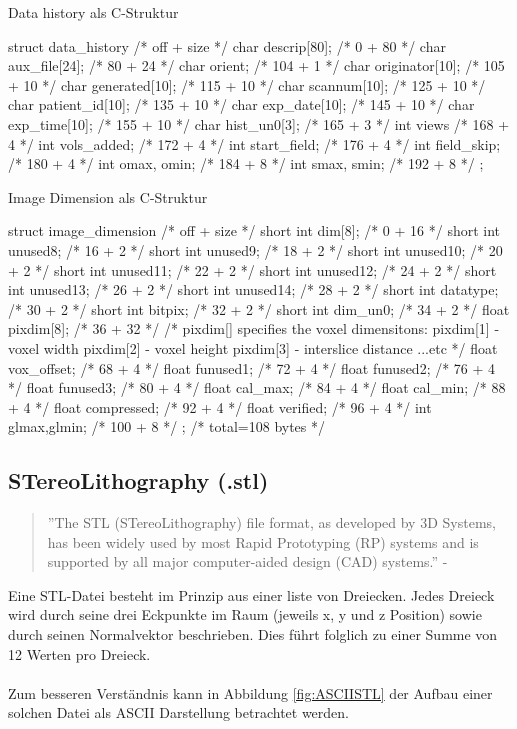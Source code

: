 \begin{program}[H]
	\caption{Data history als C-Struktur \citep{AnalyzeFormat}}
	\label{prog:dataHist}
	\begin{CCode}
struct data_history
{ /* off + size */
	char descrip[80]; /* 0 + 80 */
	char aux_file[24]; /* 80 + 24 */
	char orient; /* 104 + 1 */
	char originator[10]; /* 105 + 10 */
	char generated[10]; /* 115 + 10 */
	char scannum[10]; /* 125 + 10 */
	char patient_id[10]; /* 135 + 10 */
	char exp_date[10]; /* 145 + 10 */
	char exp_time[10]; /* 155 + 10 */
	char hist_un0[3]; /* 165 + 3 */
	int views /* 168 + 4 */
	int vols_added; /* 172 + 4 */
	int start_field; /* 176 + 4 */
	int field_skip; /* 180 + 4 */
	int omax, omin; /* 184 + 8 */
	int smax, smin; /* 192 + 8 */
}; 
	\end{CCode}
\end{program}

\begin{program}[H]
	\caption{Image Dimension als C-Struktur \citep{AnalyzeFormat}}
	\label{prog:imageDim}
	\begin{CCode}
struct image_dimension
{ /* off + size */
	short int dim[8]; /* 0 + 16 */
	short int unused8; /* 16 + 2 */
	short int unused9; /* 18 + 2 */
	short int unused10; /* 20 + 2 */
	short int unused11; /* 22 + 2 */
	short int unused12; /* 24 + 2 */
	short int unused13; /* 26 + 2 */
	short int unused14; /* 28 + 2 */
	short int datatype; /* 30 + 2 */
	short int bitpix; /* 32 + 2 */
	short int dim_un0; /* 34 + 2 */
	float pixdim[8]; /* 36 + 32 */
	/*
	pixdim[] specifies the voxel dimensitons:
	pixdim[1] - voxel width
	pixdim[2] - voxel height
	pixdim[3] - interslice distance
	...etc
	*/
	float vox_offset; /* 68 + 4 */
	float funused1; /* 72 + 4 */
	float funused2; /* 76 + 4 */
	float funused3; /* 80 + 4 */
	float cal_max; /* 84 + 4 */
	float cal_min; /* 88 + 4 */
	float compressed; /* 92 + 4 */
	float verified; /* 96 + 4 */
	int glmax,glmin; /* 100 + 8 */
}; /* total=108 bytes */ 
	\end{CCode}
\end{program}

\subsection{STereoLithography (.stl)}
\begin{quote}
	''The STL (STereoLithography) file format, as developed by 3D Systems, has been widely used by most Rapid Prototyping (RP) systems and is supported by all major computer-aided design (CAD) systems.'' - \citep{STereoLithography}
\end{quote}
Eine STL-Datei besteht im Prinzip aus einer liste von Dreiecken. Jedes Dreieck wird durch seine drei Eckpunkte im Raum (jeweils x, y und z Position) sowie durch seinen Normalvektor beschrieben. Dies führt folglich zu einer Summe von 12 Werten pro Dreieck.\\
\\
Zum besseren Verständnis kann in Abbildung \ref{fig:ASCIISTL} der Aufbau einer solchen Datei als ASCII Darstellung betrachtet werden. 

